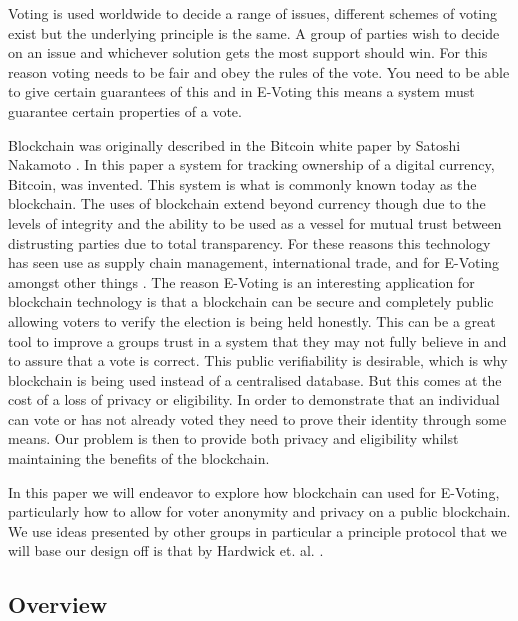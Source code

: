 \documentclass{entcs}
\begin{document}
Voting is used worldwide to decide a range of issues, different schemes of voting exist but the underlying principle is the same. A group of parties wish to decide on an issue and whichever solution gets the most support should win. For this reason voting needs to be fair and obey the rules of the vote. You need to be able to give certain guarantees of this and in E-Voting this means a system must guarantee certain properties of a vote.

Blockchain was originally described in the Bitcoin white paper by Satoshi Nakamoto \cite{BTCWhitepaper}. In this paper a system for tracking ownership of a digital currency, Bitcoin, was invented. This system is what is commonly known today as the blockchain. The uses of blockchain extend beyond currency though due to the levels of integrity and the ability to be used as a vessel for mutual trust between distrusting parties due to total transparency. For these reasons this technology has seen use as supply chain management, international trade, and for E-Voting amongst other things \cite{wust2018need}. The reason E-Voting is an interesting application for blockchain technology is that a blockchain can be secure and completely public allowing voters to verify the election is being held honestly. This can be a great tool to improve a groups trust in a system that they may not fully believe in and to assure that a vote is correct. This public verifiability is desirable, which is why blockchain is being used instead of a centralised database. But this comes at the cost of a loss of privacy or eligibility. In order to demonstrate that an individual can vote or has not already voted they need to prove their identity through some means. Our problem is then to provide both privacy and eligibility whilst maintaining the benefits of the blockchain.

In this paper we will endeavor to explore how blockchain can used for E-Voting, particularly how to allow for voter anonymity and privacy on a public blockchain. We use ideas presented by other groups in particular a principle protocol that we will base our design off is that by Hardwick et. al. \cite{hardwick2018}. 

\subsection{Overview}
\end{document}
